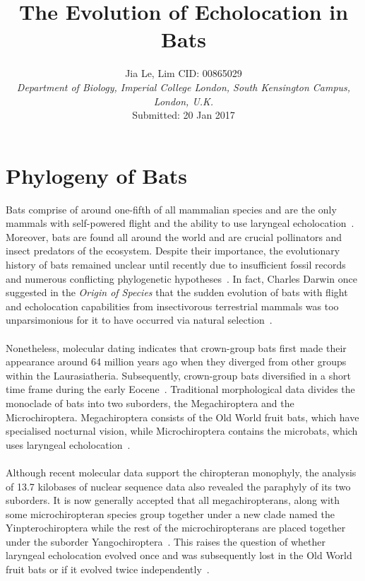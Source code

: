 \documentclass[11pt]{article}
\title{\textbf{\huge{The Evolution of Echolocation in Bats }}}
\date{}
\author{%
\large{ Jia Le, Lim {  } CID: 00865029 } \\
\textnormal
{\textit{Department of Biology, Imperial College London, South Kensington Campus, London, U.K.}} \\
Submitted: 20 Jan 2017
}
\makeatletter
\renewcommand{\maketitle}{\bgroup\setlength{\parindent}{0pt}
\begin{flushleft}
  \textbf{\@title} %

  \@author
\end{flushleft}\egroup
}
\makeatother
\begin{document}
\maketitle
\bigskip

\tableofcontents

\section{Phylogeny of Bats}

Bats comprise of around one-fifth of all mammalian species and are the only mammals with self-powered flight and the ability to use laryngeal echolocation~\citep{Teeling2009}. Moreover, bats are found all around the world and are crucial pollinators and insect predators of the ecosystem. Despite their importance, the evolutionary history of bats remained unclear until recently due to insufficient fossil records and numerous conflicting phylogenetic hypotheses~\citep{Teeling2005}. In fact, Charles Darwin once suggested in the \textit{Origin of Species} that the sudden evolution of bats with flight and echolocation capabilities from insectivorous terrestrial mammals was too unparsimonious for it to have occurred via natural selection~\citep{Darwin1859a}.
\\
\\
Nonetheless, molecular dating indicates that crown-group bats first made their appearance around 64 million years ago when they diverged from other groups within the Laurasiatheria. Subsequently, crown-group bats diversified in a short time frame during the early Eocene~\citep{Teeling2009}. Traditional morphological data divides the monoclade of bats into two suborders, the Megachiroptera and the Microchiroptera. Megachiroptera consists of the Old World fruit bats, which have specialised nocturnal vision, while Microchiroptera contains the microbats, which uses laryngeal echolocation~\citep{Jones2006}. 
\\
\\
Although recent molecular data support the chiropteran monophyly, the analysis of 13.7 kilobases of nuclear sequence data also revealed the paraphyly of its two suborders. It is now generally accepted that all megachiropterans, along with some microchiropteran species group together under a new clade named the Yinpterochiroptera while the rest of the microchiropterans are placed together under the suborder Yangochiroptera~\citep{Teeling2005}. This raises the question of whether laryngeal echolocation evolved once and was subsequently lost in the Old World fruit bats or if it evolved twice independently~\citep{Teeling2009}.
\end{document}
